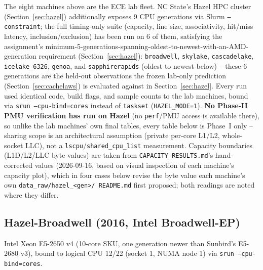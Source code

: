 \documentclass{article}
\begin{document}
The eight machines above are the ECE lab fleet. NC State's Hazel HPC cluster
(Section~\ref{sec:hazel}) additionally exposes 9 CPU generations via Slurm
\texttt{--constraint}; the full timing-only suite (capacity, line size, associativity,
hit/miss latency, inclusion/exclusion) has been run on 6 of them, satisfying the
assignment's minimum-5-generations-spanning-oldest-to-newest-with-an-AMD-generation
requirement (Section~\ref{sec:hazel}):
\texttt{broadwell}, \texttt{skylake}, \texttt{cascadelake}, \texttt{icelake\_6326},
\label{sec:permachine-hazel}
\texttt{genoa}, and \texttt{sapphirerapids} (oldest to newest below) -- these 6
generations are the held-out observations the frozen lab-only prediction
(Section~\ref{sec:cachelaws}) is evaluated against in Section~\ref{sec:hazel}. Every run used
identical code, build flags, and sample counts to the lab machines, bound via
\texttt{srun --cpu-bind=cores} instead of \texttt{taskset} (\texttt{HAZEL\_MODE=1}).
\textbf{No Phase-II PMU verification has run on Hazel} (no \texttt{perf}/PMU access is
available there), so unlike the lab machines' own final tables, every table below is Phase~I only -- sharing scope is an
architectural assumption (private per-core L1/L2, whole-socket LLC), not a
\texttt{lscpu}/\texttt{shared\_cpu\_list} measurement. Capacity boundaries (L1D/L2/LLC
byte values) are taken from \texttt{CAPACITY\_RESULTS.md}'s hand-corrected values
(2026-09-16, based on visual inspection of each machine's capacity plot), which in four
cases below revise the byte value each machine's own \texttt{data\_raw/hazel\_<gen>/
README.md} first proposed; both readings are noted where they differ.

\subsection{Hazel-Broadwell (2016, Intel Broadwell-EP)}
\label{sec:machine-hazel-broadwell}

Intel Xeon E5-2650 v4 (10-core SKU, one generation newer than Sunbird's E5-2680 v3), bound
to logical CPU 12/22 (socket 1, NUMA node 1) via \texttt{srun --cpu-bind=cores}.
\end{document}
